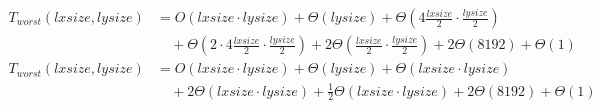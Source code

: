 \begin{subequations}
\label{eq:analyse-arlabeling-all-2}
\begin{align}
\label{eq:analyse-arlabeling-all-2-1}
T_{worst}(\mathit{lxsize},\mathit{lysize})& =
O(\mathit{lxsize}\cdot\mathit{lysize})
+ \Theta(\mathit{lysize})
+ \Theta(4\frac{\mathit{lxsize}}{2}\cdot\frac{\mathit{lysize}}{2})
\\
& \quad
+ \Theta(2\cdot4\frac{\mathit{lxsize}}{2}\cdot\frac{\mathit{lysize}}{2})
+ 2\Theta(\frac{\mathit{lxsize}}{2}\cdot\frac{\mathit{lysize}}{2})
+ 2\Theta(8192)
+ \Theta(1)
\nonumber \\
\label{eq:analyse-arlabeling-all-2-2}
T_{worst}(\mathit{lxsize},\mathit{lysize})& =
O(\mathit{lxsize}\cdot\mathit{lysize})
+ \Theta(\mathit{lysize})
+ \Theta(\mathit{lxsize}\cdot\mathit{lysize})
\\
& \quad
+ 2\Theta(\mathit{lxsize}\cdot\mathit{lysize})
+ \frac{1}{2}\Theta(\mathit{lxsize}\cdot\mathit{lysize})
+ 2\Theta(8192)
+ \Theta(1)
\nonumber
\end{align}
\end{subequations}

